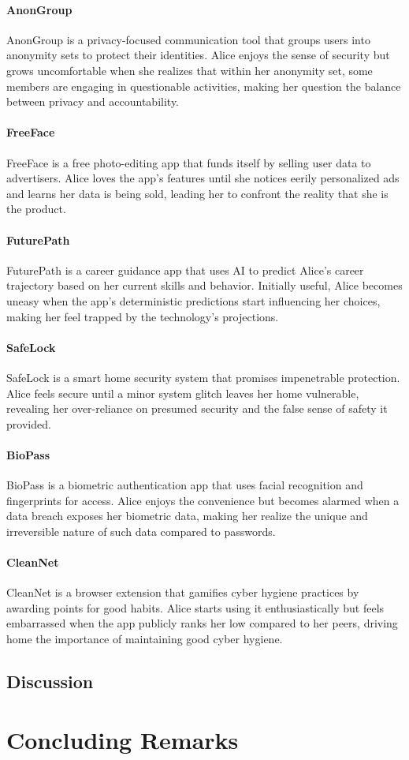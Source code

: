 \paragraph{AnonGroup}
AnonGroup is a privacy-focused communication tool that groups users into anonymity sets to protect their identities. Alice enjoys the sense of security but grows uncomfortable when she realizes that within her anonymity set, some members are engaging in questionable activities, making her question the balance between privacy and accountability.

\paragraph{FreeFace}
FreeFace is a free photo-editing app that funds itself by selling user data to advertisers. Alice loves the app's features until she notices eerily personalized ads and learns her data is being sold, leading her to confront the reality that she is the product.

\paragraph{FuturePath}
FuturePath is a career guidance app that uses AI to predict Alice's career trajectory based on her current skills and behavior. Initially useful, Alice becomes uneasy when the app's deterministic predictions start influencing her choices, making her feel trapped by the technology's projections.

\paragraph{SafeLock}
SafeLock is a smart home security system that promises impenetrable protection. Alice feels secure until a minor system glitch leaves her home vulnerable, revealing her over-reliance on presumed security and the false sense of safety it provided.

\paragraph{BioPass}
BioPass is a biometric authentication app that uses facial recognition and fingerprints for access. Alice enjoys the convenience but becomes alarmed when a data breach exposes her biometric data, making her realize the unique and irreversible nature of such data compared to passwords.

\paragraph{CleanNet} 
CleanNet is a browser extension that gamifies cyber hygiene practices by awarding points for good habits. Alice starts using it enthusiastically but feels embarrassed when the app publicly ranks her low compared to her peers, driving home the importance of maintaining good cyber hygiene.

\subsection{Discussion}

\section{Concluding Remarks}


